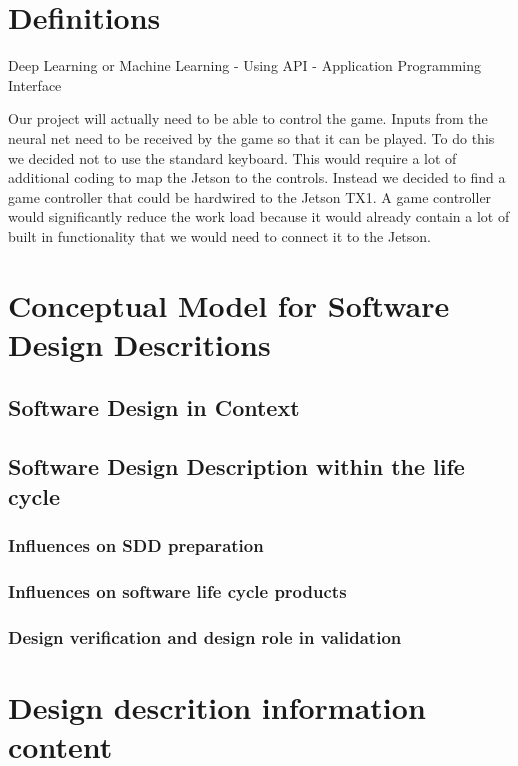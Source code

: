 \documentclass{scrreprt}
\begin{document}
\chapter{Definitions}

Deep Learning or Machine Learning - Using
API - Application Programming Interface

Our project will actually need to be able to control the game.
Inputs from the neural net need to be received by the game so that it can be played.
To do this we decided not to use the standard keyboard.
This would require a lot of additional coding to map the Jetson to the controls.
Instead we decided to find a game controller that could be hardwired to the Jetson TX1.
A game controller would significantly reduce the work load because it would already contain a lot of built in functionality that we would need to connect it to the Jetson.


\chapter{Conceptual Model for Software Design Descritions}

\section{Software Design in Context}

\section{Software Design Description within the life cycle}

\subsection{Influences on SDD preparation}

\subsection{Influences on software life cycle products}

\subsection{Design verification and design role in validation}

\chapter{Design descrition information content}
\end{document}
